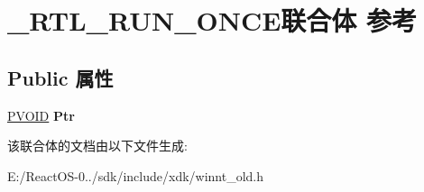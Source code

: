 \hypertarget{union___r_t_l___r_u_n___o_n_c_e}{}\section{\+\_\+\+R\+T\+L\+\_\+\+R\+U\+N\+\_\+\+O\+N\+C\+E联合体 参考}
\label{union___r_t_l___r_u_n___o_n_c_e}
\subsection*{Public 属性}
\begin{DoxyCompactItemize}
\item 
\mbox{\label{union___r_t_l___r_u_n___o_n_c_e_ac258f02f561050331b15eb9b158c07ab}} 
\hyperlink{interfacevoid}{P\+V\+O\+ID} {\bfseries Ptr}
\end{DoxyCompactItemize}


该联合体的文档由以下文件生成\+:\begin{DoxyCompactItemize}
\item 
E\+:/\+React\+O\+S-\/0../sdk/include/xdk/winnt\+\_\+old.\+h\end{DoxyCompactItemize}
